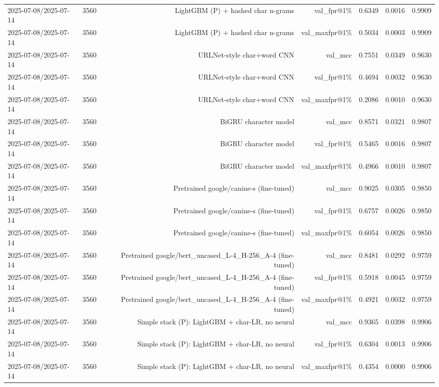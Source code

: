 \begin{table}[t]
\begin{tabular}{llrrrrr}
2025-07-08/2025-07-14 & 3560 & LightGBM (P) + hashed char n-grams & val\_fpr@1\% & 0.6349 & 0.0016 & 0.9909 \\
2025-07-08/2025-07-14 & 3560 & LightGBM (P) + hashed char n-grams & val\_maxfpr@1\% & 0.5034 & 0.0003 & 0.9909 \\
2025-07-08/2025-07-14 & 3560 & URLNet-style char+word CNN & val\_mcc & 0.7551 & 0.0349 & 0.9630 \\
2025-07-08/2025-07-14 & 3560 & URLNet-style char+word CNN & val\_fpr@1\% & 0.4694 & 0.0032 & 0.9630 \\
2025-07-08/2025-07-14 & 3560 & URLNet-style char+word CNN & val\_maxfpr@1\% & 0.2086 & 0.0010 & 0.9630 \\
2025-07-08/2025-07-14 & 3560 & BiGRU character model & val\_mcc & 0.8571 & 0.0321 & 0.9807 \\
2025-07-08/2025-07-14 & 3560 & BiGRU character model & val\_fpr@1\% & 0.5465 & 0.0016 & 0.9807 \\
2025-07-08/2025-07-14 & 3560 & BiGRU character model & val\_maxfpr@1\% & 0.4966 & 0.0010 & 0.9807 \\
2025-07-08/2025-07-14 & 3560 & Pretrained google/canine-s (fine-tuned) & val\_mcc & 0.9025 & 0.0305 & 0.9850 \\
2025-07-08/2025-07-14 & 3560 & Pretrained google/canine-s (fine-tuned) & val\_fpr@1\% & 0.6757 & 0.0026 & 0.9850 \\
2025-07-08/2025-07-14 & 3560 & Pretrained google/canine-s (fine-tuned) & val\_maxfpr@1\% & 0.6054 & 0.0026 & 0.9850 \\
2025-07-08/2025-07-14 & 3560 & Pretrained google/bert\_uncased\_L-4\_H-256\_A-4 (fine-tuned) & val\_mcc & 0.8481 & 0.0292 & 0.9759 \\
2025-07-08/2025-07-14 & 3560 & Pretrained google/bert\_uncased\_L-4\_H-256\_A-4 (fine-tuned) & val\_fpr@1\% & 0.5918 & 0.0045 & 0.9759 \\
2025-07-08/2025-07-14 & 3560 & Pretrained google/bert\_uncased\_L-4\_H-256\_A-4 (fine-tuned) & val\_maxfpr@1\% & 0.4921 & 0.0032 & 0.9759 \\
2025-07-08/2025-07-14 & 3560 & Simple stack (P): LightGBM + char-LR, no neural & val\_mcc & 0.9365 & 0.0398 & 0.9906 \\
2025-07-08/2025-07-14 & 3560 & Simple stack (P): LightGBM + char-LR, no neural & val\_fpr@1\% & 0.6304 & 0.0013 & 0.9906 \\
2025-07-08/2025-07-14 & 3560 & Simple stack (P): LightGBM + char-LR, no neural & val\_maxfpr@1\% & 0.4354 & 0.0000 & 0.9906 \\

\end{tabular}
\end{table}
